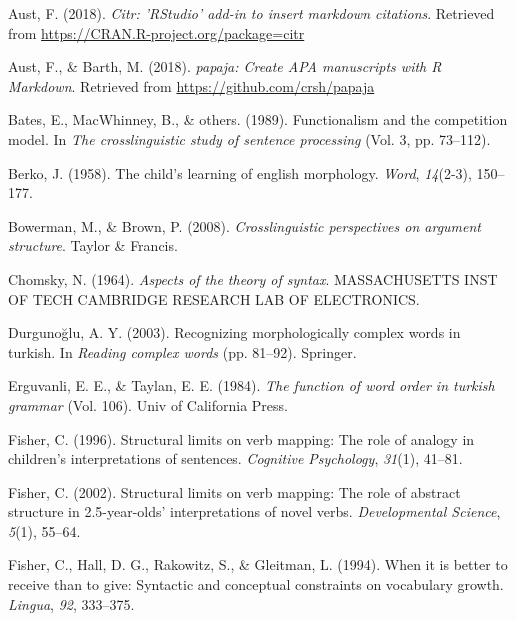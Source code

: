 \documentclass[man]{apa6}
\begin{document}
\begingroup
\setlength{\parindent}{-0.5in} \setlength{\leftskip}{0.5in}

\hypertarget{refs}{}
\hypertarget{ref-R-citr}{}
Aust, F. (2018). \emph{Citr: 'RStudio' add-in to insert markdown
citations}. Retrieved from \url{https://CRAN.R-project.org/package=citr}

\hypertarget{ref-R-papaja}{}
Aust, F., \& Barth, M. (2018). \emph{papaja: Create APA manuscripts with
R Markdown}. Retrieved from \url{https://github.com/crsh/papaja}

\hypertarget{ref-bates1989functionalism}{}
Bates, E., MacWhinney, B., \& others. (1989). Functionalism and the
competition model. In \emph{The crosslinguistic study of sentence
processing} (Vol. 3, pp. 73--112).

\hypertarget{ref-berko1958child}{}
Berko, J. (1958). The child's learning of english morphology.
\emph{Word}, \emph{14}(2-3), 150--177.

\hypertarget{ref-bowerman2008crosslinguistic}{}
Bowerman, M., \& Brown, P. (2008). \emph{Crosslinguistic perspectives on
argument structure}. Taylor \& Francis.

\hypertarget{ref-chomsky1964aspects}{}
Chomsky, N. (1964). \emph{Aspects of the theory of syntax}.
MASSACHUSETTS INST OF TECH CAMBRIDGE RESEARCH LAB OF ELECTRONICS.

\hypertarget{ref-durgunouglu2003recognizing}{}
Durgunoğlu, A. Y. (2003). Recognizing morphologically complex words in
turkish. In \emph{Reading complex words} (pp. 81--92). Springer.

\hypertarget{ref-erguvanli1984function}{}
Erguvanli, E. E., \& Taylan, E. E. (1984). \emph{The function of word
order in turkish grammar} (Vol. 106). Univ of California Press.

\hypertarget{ref-fisher1996structural}{}
Fisher, C. (1996). Structural limits on verb mapping: The role of
analogy in children's interpretations of sentences. \emph{Cognitive
Psychology}, \emph{31}(1), 41--81.

\hypertarget{ref-fisher2002structural}{}
Fisher, C. (2002). Structural limits on verb mapping: The role of
abstract structure in 2.5-year-olds' interpretations of novel verbs.
\emph{Developmental Science}, \emph{5}(1), 55--64.

\hypertarget{ref-fisher1994better}{}
Fisher, C., Hall, D. G., Rakowitz, S., \& Gleitman, L. (1994). When it
is better to receive than to give: Syntactic and conceptual constraints
on vocabulary growth. \emph{Lingua}, \emph{92}, 333--375.
\end{document}
